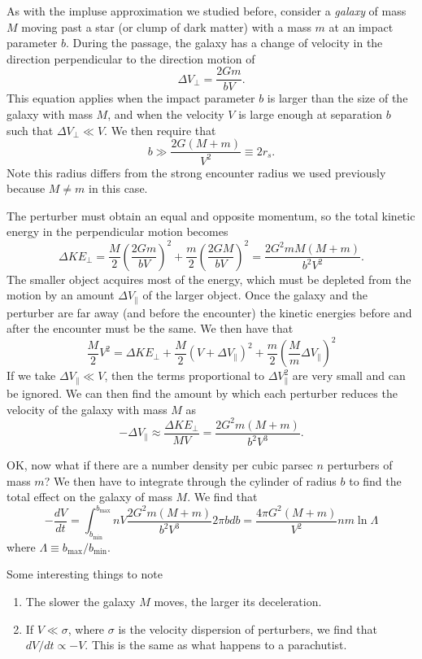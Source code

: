 \documentclass[]{article}
\begin{document}
As with the impluse approximation we studied before, consider a
{\it galaxy} of mass $M$ moving past a star (or clump of dark matter)
with a mass $m$ at an impact parameter $b$.  During the passage, the
galaxy has a change of velocity in the direction perpendicular to the
direction motion of
\begin{equation}
\Delta V_{\perp} = \frac{2Gm}{bV}.
\end{equation}
\noindent
This equation applies when the impact parameter $b$ is larger than the
size of the galaxy with mass $M$, and when the velocity $V$ is large
enough at separation $b$ such that $\Delta V_{\perp}\ll V$.  We then
require that
\begin{equation}
b \gg \frac{2G(M+m)}{V^2} \equiv 2 r_s.
\end{equation}
\noindent
Note this radius differs from the strong encounter radius we used
previously because $M\ne m$ in this case.

The perturber must obtain an equal and opposite momentum, so the
total kinetic energy in the perpendicular motion becomes
\begin{equation}
\Delta KE_{\perp} = \frac{M}{2}\left(\frac{2Gm}{bV}\right)^2 + \frac{m}{2}\left(\frac{2GM}{bV}\right)^2 = \frac{2G^2mM(M+m)}{b^2 V^2}.
\end{equation}
\noindent
The smaller object acquires most of the energy, which must be depleted from the motion by an amount $\Delta V_{\parallel}$ of the
larger object.  Once the galaxy and the perturber are far away (and before the encounter) the kinetic energies 
before and after the encounter must be the same.  We then have that
\begin{equation}
\frac{M}{2}V^2 = \Delta KE_{\perp} + \frac{M}{2}(V + \Delta V_{\parallel})^2 + \frac{m}{2}\left(\frac{M}{m} \Delta V_{\parallel} \right)^2
\end{equation}
\noindent
If we take $\Delta V_{\parallel} \ll V$, then the terms proportional to $\Delta V_{\parallel}^2$ are very small and
can be ignored.  We can then find the amount by which each perturber reduces the velocity of the galaxy with
mass $M$ as
\begin{equation}
- \Delta V_{\parallel} \approx \frac{\Delta KE_{\perp}}{M V} = \frac{2G^2 m(M+m)}{b^2 V^3}.
\end{equation}

OK, now what if there are a number density per cubic parsec $n$ perturbers of mass $m$?  
We then have to integrate through the cylinder of radius $b$ to find the total
effect on the galaxy of mass $M$.  We find that
\begin{equation}
-\frac{dV}{dt} = \int_{b_{\mathrm{min}}}^{b_{\mathrm{max}}} n V \frac{2G^2 m (M+m)}{b^2 V^3} 2\pi b db = \frac{4\pi G^2(M+m)}{V^2} n m \ln \Lambda
\end{equation}
\noindent
where $\Lambda\equiv b_{\mathrm{max}}/b_{\mathrm{min}}$.

Some interesting things to note
\begin{enumerate}
\item The slower the galaxy $M$ moves, the larger its deceleration.
\item If $V\ll\sigma$, where $\sigma$ is the velocity dispersion of perturbers, we find that $dV/dt\propto -V$.  This is the same as what happens to a parachutist.
\end{enumerate}
\end{document}
